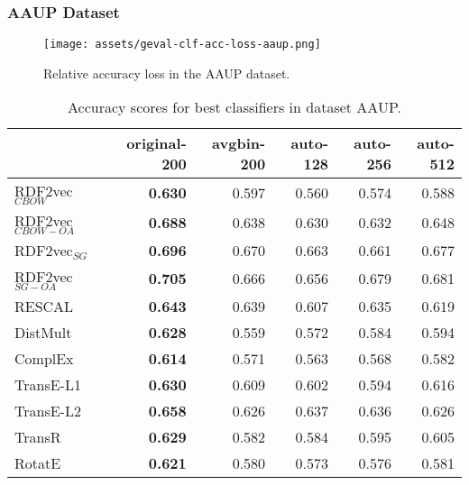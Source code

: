 \documentclass[11pt,titlepage,oneside,openany]{book}
\begin{document}
\newpage

\subsubsection{AAUP Dataset}
\label{subsubsec:geval-results-clf-aaup}

\begin{figure}[H]
    \centering
    \texttt{[image: assets/geval-clf-acc-loss-aaup.png]}
    \vspace*{-3mm}
    \caption{Relative accuracy loss in the AAUP dataset.}
    \label{fig:geval-clf-acc-loss-aaup}
\end{figure}


\begin{table}[H]
\centering
\begin{tabular}{lrrrrr}
\toprule
{} &  original-200 &  avgbin-200 &  auto-128 &  auto-256 &  auto-512 \\
\midrule
RDF2vec$_{CBOW}$     &	\textbf{0.630} &       0.597  &     0.560  &     0.574  &     0.588  \\
RDF2vec$_{CBOW-OA}$  &	\textbf{0.688} &       0.638  &     0.630  &     0.632  &     0.648  \\
RDF2vec$_{SG}$       &	\textbf{0.696} &       0.670  &     0.663  &     0.661  &     0.677  \\
RDF2vec$_{SG-OA}$    &	\textbf{0.705} &       0.666  &     0.656  &     0.679  &     0.681  \\
RESCAL               &	\textbf{0.643} &       0.639  &     0.607  &     0.635  &     0.619  \\
DistMult             &	\textbf{0.628} &       0.559  &     0.572  &     0.584  &     0.594  \\
ComplEx              &	\textbf{0.614} &       0.571  &     0.563  &     0.568  &     0.582  \\
TransE-L1            &	\textbf{0.630} &       0.609  &     0.602  &     0.594  &     0.616  \\
TransE-L2            &	\textbf{0.658} &       0.626  &     0.637  &     0.636  &     0.626  \\
TransR               &	\textbf{0.629} &       0.582  &     0.584  &     0.595  &     0.605  \\
RotatE               &	\textbf{0.621} &       0.580  &     0.573  &     0.576  &     0.581  \\
\bottomrule
\end{tabular}
\caption{Accuracy scores for best classifiers in dataset AAUP.}
\label{tab:geval-clf-acc-aaup}
\end{table}
\end{document}
